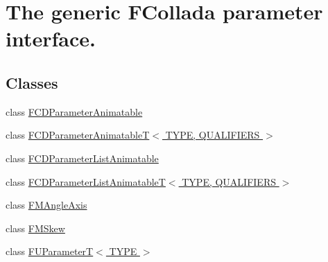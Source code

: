 \hypertarget{group__FUParameter}{
\section{The generic FCollada parameter interface.}
\label{group__FUParameter}
}
\subsection*{Classes}
\begin{DoxyCompactItemize}
\item 
class \hyperlink{classFCDParameterAnimatable}{FCDParameterAnimatable}
\item 
class \hyperlink{classFCDParameterAnimatableT}{FCDParameterAnimatableT$<$ TYPE, QUALIFIERS $>$}
\item 
class \hyperlink{classFCDParameterListAnimatable}{FCDParameterListAnimatable}
\item 
class \hyperlink{classFCDParameterListAnimatableT}{FCDParameterListAnimatableT$<$ TYPE, QUALIFIERS $>$}
\item 
class \hyperlink{classFMAngleAxis}{FMAngleAxis}
\item 
class \hyperlink{classFMSkew}{FMSkew}
\item 
class \hyperlink{classFUParameterT}{FUParameterT$<$ TYPE $>$}
\end{DoxyCompactItemize}
